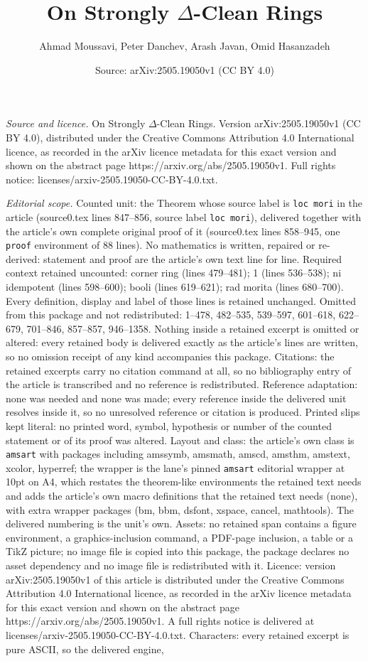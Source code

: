 \documentclass[10pt,a4paper]{amsart}
\title[On Strongly $\Delta$-Clean Rings]{On Strongly $\Delta$-Clean Rings}
\author{Ahmad Moussavi, Peter Danchev, Arash Javan, Omid Hasanzadeh}
\date{Source: arXiv:2505.19050v1 (CC BY 4.0)}
\begin{document}
\maketitle

\noindent\emph{Source and licence.} On Strongly $\Delta$-Clean Rings. Version arXiv:2505.19050v1 (CC BY 4.0), distributed under the Creative Commons Attribution 4.0 International licence, as recorded in the arXiv licence metadata for this exact version and shown on the abstract page https://arxiv.org/abs/2505.19050v1. Full rights notice: licenses/arxiv-2505.19050-CC-BY-4.0.txt.\par\smallskip

\noindent\textit{Editorial scope.} Counted unit: the Theorem whose source label is \texttt{loc mori} in the article (source0.tex lines 847--856, source label \texttt{loc mori}), delivered together with the article's own complete original proof of it (source0.tex lines 858--945, one \texttt{proof} environment of 88 lines). No mathematics is written, repaired or re-derived: statement and proof are the article's own text line for line. Required context retained uncounted: corner ring (lines 479--481); 1 (lines 536--538); ni idempotent (lines 598--600); booli (lines 619--621); rad morita (lines 680--700). Every definition, display and label of those lines is retained unchanged. Omitted from this package and not redistributed: 1--478, 482--535, 539--597, 601--618, 622--679, 701--846, 857--857, 946--1358. Nothing inside a retained excerpt is omitted or altered: every retained body is delivered exactly as the article's lines are written, so no omission receipt of any kind accompanies this package. Citations: the retained excerpts carry no citation command at all, so no bibliography entry of the article is transcribed and no reference is redistributed. Reference adaptation: none was needed and none was made; every reference inside the delivered unit resolves inside it, so no unresolved reference or citation is produced. Printed slips kept literal: no printed word, symbol, hypothesis or number of the counted statement or of its proof was altered. Layout and class: the article's own class is \texttt{amsart} with packages including amssymb, amsmath, amscd, amsthm, amstext, xcolor, hyperref; the wrapper is the lane's pinned \texttt{amsart} editorial wrapper at 10pt on A4, which restates the theorem-like environments the retained text needs and adds the article's own macro definitions that the retained text needs (none), with extra wrapper packages (bm, bbm, dsfont, xspace, cancel, mathtools). The delivered numbering is the unit's own. Assets: no retained span contains a figure environment, a graphics-inclusion command, a PDF-page inclusion, a table or a TikZ picture; no image file is copied into this package, the package declares no asset dependency and no image file is redistributed with it. Licence: version arXiv:2505.19050v1 of this article is distributed under the Creative Commons Attribution 4.0 International licence, as recorded in the arXiv licence metadata for this exact version and shown on the abstract page https://arxiv.org/abs/2505.19050v1. A full rights notice is delivered at licenses/arxiv-2505.19050-CC-BY-4.0.txt. Characters: every retained excerpt is pure ASCII, so the delivered engine, 
\end{document}
